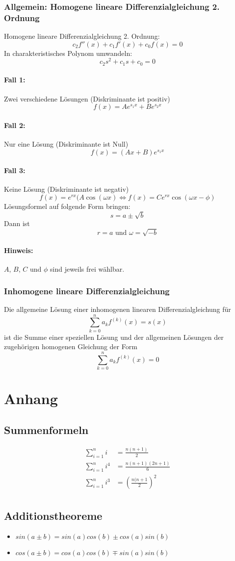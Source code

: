 \subsubsection{Allgemein: Homogene lineare Differenzialgleichung 2. Ordnung}
Homogene lineare Differenzialgleichung 2. Ordnung:
\[ c_2f''(x) + c_1f'(x) + c_0f(x) = 0 \]
In charakteristisches Polynom umwandeln:
\[ c_2s^2 + c_1s + c_0 = 0 \]
\paragraph{Fall 1:} Zwei verschiedene Lösungen (Diskriminante ist positiv)
\[ f(x) = Ae^{s_1x} + Be^{s_2x} \]
\paragraph{Fall 2:} Nur eine Lösung (Diskriminante ist Null)
\[ f(x) = (Ax + B) e^{s_1x} \]
\paragraph{Fall 3:} Keine Lösung (Diskriminante ist negativ)
\[ f(x) = e^{rx} (A\cos(\omega x) \Leftrightarrow
  f(x) = Ce^{rx} \cos(\omega x - \phi) \]
Lösungsformel auf folgende Form bringen:
\[ s = a \pm \sqrt{b} \]
Dann ist
\[ r = a \text{ und } \omega = \sqrt{-b} \]
\paragraph{Hinweis:} $A$, $B$, $C$ und $\phi$ sind jeweils frei wählbar.

\subsubsection{Inhomogene lineare Differenzialgleichung}
Die allgemeine Lösung einer inhomogenen linearen Differenzialgleichung
für
\[ \sum_{k=0}^{n} a_{k}f^{(k)}(x) = s(x) \]
ist die Summe einer speziellen Lösung  und  der allgemeinen
Lösungen der zugehörigen homogenen Gleichung der Form
\[ \sum_{k=0}^{n} a_{k}f^{(k)}(x) = 0 \]

\section{Anhang}
\subsection{Summenformeln}
\[ \begin{aligned}
  \sum_{i=1}^{n}i     & = \frac{n(n+1)}{2} \\
  \sum_{i=1}^{n}i^4   & = \frac{n(n+1)(2n+1)}{6} \\
  \sum_{i=1}^{n}i^3   & = \left(\frac{n(n+1}{2}\right)^2 \\
\end{aligned} \]
\subsection{Additionstheoreme}
\begin{itemize}
  \item $sin(a \pm b) = sin(a) cos(b) \pm cos(a) sin(b)$
  \item $cos(a \pm b) = cos(a) cos(b) \mp sin(a) sin(b)$
\end{itemize}
